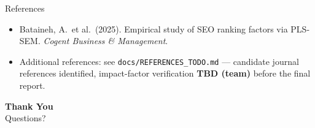 \documentclass[aspectratio=169]{beamer}
\begin{document}
\begin{frame}{References}
  \begin{itemize}
    \item Bataineh, A.\ et al.\ (2025). Empirical study of SEO ranking factors via PLS-SEM. \emph{Cogent Business \& Management}.
    \item Additional references: see \texttt{docs/REFERENCES\_TODO.md} — candidate journal references identified, impact-factor verification \textbf{TBD (team)} before the final report.
  \end{itemize}
\end{frame}

\begin{frame}
  \centering
  {\Huge \color{navyPrimary} \textbf{Thank You}}\\[0.5cm]
  {\large Questions?}
\end{frame}
\end{document}
